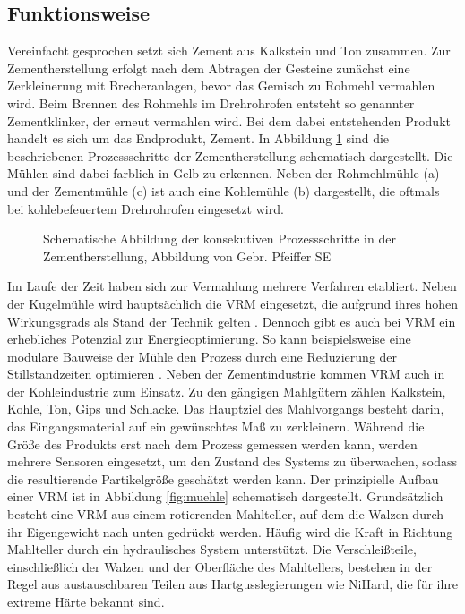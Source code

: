 \subsection{Funktionsweise} \label{sec:funktionsweise}
Vereinfacht gesprochen setzt sich Zement aus Kalkstein und Ton zusammen. Zur Zementherstellung erfolgt nach dem Abtragen der Gesteine zunächst eine Zerkleinerung mit Brecheranlagen, bevor das Gemisch zu Rohmehl vermahlen wird. Beim Brennen des Rohmehls im Drehrohrofen entsteht so genannter Zementklinker, der erneut vermahlen wird. Bei dem dabei entstehenden Produkt handelt es sich um das Endprodukt, Zement. 
In Abbildung \ref{fig:zementindustrie} sind die beschriebenen Prozessschritte der Zementherstellung schematisch dargestellt. Die Mühlen sind dabei farblich in Gelb zu erkennen. Neben der Rohmehlmühle (a) und der Zementmühle (c) ist auch eine Kohlemühle (b) dargestellt, die oftmals bei kohlebefeuertem Drehrohrofen eingesetzt wird.
%
\begin{figure}[htb!]
    \vspace{5mm}
    \centering
    
    \caption{Schematische Abbildung der konsekutiven Prozessschritte in der Zementherstellung, Abbildung von Gebr. Pfeiffer SE}
    \label{fig:zementindustrie}
\end{figure}
%
Im Laufe der Zeit haben sich zur Vermahlung mehrere Verfahren etabliert. Neben der Kugelmühle wird hauptsächlich die \ac{VRM} eingesetzt, die aufgrund ihres hohen Wirkungsgrads als Stand der Technik gelten \cite{schaefer.2001}. Dennoch gibt es auch bei \ac{VRM} ein erhebliches Potenzial zur Energieoptimierung. So kann beispielsweise eine modulare Bauweise der Mühle den Prozess durch eine Reduzierung der Stillstandzeiten optimieren \cite{woywadt.2017}. Neben der Zementindustrie kommen \ac{VRM} auch in der Kohleindustrie zum Einsatz. Zu den gängigen Mahlgütern zählen Kalkstein, Kohle, Ton, Gips und Schlacke.
Das Hauptziel des Mahlvorgangs besteht darin, das Eingangsmaterial auf ein gewünschtes Maß zu zerkleinern. Während die Größe des Produkts erst nach dem Prozess gemessen werden kann, werden mehrere Sensoren eingesetzt, um den Zustand des Systems zu überwachen, sodass die resultierende Partikelgröße geschätzt werden kann.
Der prinzipielle Aufbau einer \ac{VRM} ist in Abbildung \ref{fig:muehle} schematisch dargestellt. Grundsätzlich besteht eine \ac{VRM} aus einem rotierenden Mahlteller, auf dem die Walzen durch ihr Eigengewicht nach unten gedrückt werden. Häufig wird die Kraft in Richtung Mahlteller durch ein hydraulisches System unterstützt. Die Verschleißteile, einschließlich der Walzen und der Oberfläche des Mahltellers, bestehen in der Regel aus austauschbaren Teilen aus Hartgusslegierungen wie NiHard, die für ihre extreme Härte bekannt sind.
